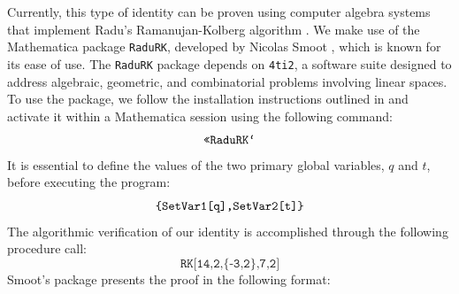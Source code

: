 \documentclass{article}
\begin{document}
Currently, this type of identity can be proven using computer algebra systems that implement Radu's Ramanujan-Kolberg algorithm \cite{Radu}. We make use of the Mathematica package \texttt{RaduRK}, developed by Nicolas Smoot \cite{Smoot}, which is known for its ease of use. The \texttt{RaduRK} package depends on \texttt{4ti2}, a software suite designed to address algebraic, geometric, and combinatorial problems involving linear spaces. To use the package, we follow the installation instructions outlined in \cite{Smoot} and activate it within a Mathematica session using the following command:
$$\text{\texttt{<<RaduRK`}}$$
It is essential to define the values of the two primary global variables, $q$ and $t$, before executing the program:
$$\text{\texttt{\{SetVar1[q],SetVar2[t]\}}}$$
The algorithmic verification of our identity is accomplished through the following procedure call:
$$\texttt{RK[14,2,\{-3,2\},7,2]}$$
Smoot's package presents the proof in the following format:
\end{document}
